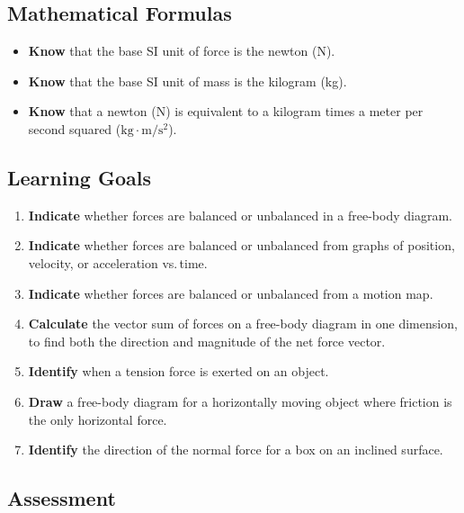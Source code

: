 \documentclass[dvipsnames]{article}
\begin{document}
\subsection*{Mathematical Formulas}

\begin{itemize}[topsep=-3pt,itemsep=0pt]
    \item \textbf{Know} that the base SI unit of force is the newton (N).
    \item \textbf{Know} that the base SI unit of mass is the kilogram (kg).
    \item \textbf{Know} that a newton (N) is equivalent to a kilogram times a meter per second squared ($\mathrm{kg\cdot m/s^2}$).
\end{itemize}

\subsection*{Learning Goals}

\begin{enumerate}[itemsep=0pt]
    \item \textbf{Indicate} whether forces are balanced or unbalanced in a free-body diagram.
    \item \textbf{Indicate} whether forces are balanced or unbalanced from graphs of position, velocity, or acceleration vs.\,time.
    \item \textbf{Indicate} whether forces are balanced or unbalanced from a motion map.
    \item \textbf{Calculate} the vector sum of forces on a free-body diagram in one dimension, to find both the direction and magnitude of the net force vector.
    \item \textbf{Identify} when a tension force is exerted on an object.
    \item \textbf{Draw} a free-body diagram for a horizontally moving object where friction is the only horizontal force.
    \item \textbf{Identify} the direction of the normal force for a box on an inclined surface.
\end{enumerate}

\subsection*{Assessment}
\end{document}
